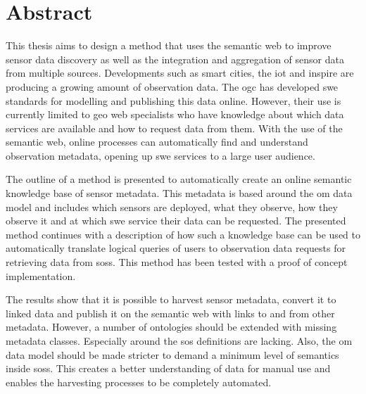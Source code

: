 
\chapter*{Abstract}


This thesis aims to design a method that uses the semantic web to improve sensor data discovery as well as the integration and aggregation of sensor data from multiple sources. Developments such as smart cities, the \acf*{iot} and \ac*{inspire} are producing a growing amount of observation data. The \ac*{ogc} has developed \ac*{swe} standards for modelling and publishing this data online. However, their use is currently limited to geo web specialists who have knowledge about which data services are available and how to request data from them. With the use of the semantic web, online processes can automatically find and understand observation metadata, opening up \acs*{swe} services to a large user audience. 

The outline of a method is presented to automatically create an online semantic knowledge base of sensor metadata. This metadata is based around the \acf*{om} data model and includes which sensors are deployed, what they observe, how they observe it and at which \acs*{swe} service their data can be requested. The presented method continues with a description of how such a knowledge base can be used to automatically translate logical queries of users to observation data requests for retrieving data from \acfp*{sos}. This method has been tested with a proof of concept implementation.

The results show that it is possible to harvest sensor metadata, convert it to linked data and publish it on the semantic web with links to and from other metadata. However, a number of ontologies should be extended with missing metadata classes. Especially around the \acs*{sos} definitions are lacking. Also, the \acs*{om} data model should be made stricter to demand a minimum level of semantics inside \aclp*{sos}. This creates a better understanding of data for manual use and enables the harvesting processes to be completely automated.    

